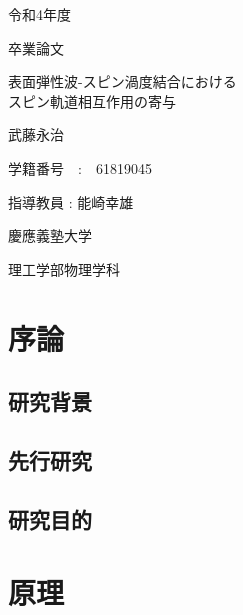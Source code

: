 \documentclass[dvipdfmx]{jsreport}
\numberwithin{equation}{chapter}
\numberwithin{table}{chapter}
\begin{document}
\begin{titlepage}
	\begin{center}
		
		{\large 令和4年度}
		
		\vspace{10truept}
		
		{\large 卒業論文}
		
		\vspace*{100truept}
		
		{\huge 表面弾性波-スピン渦度結合における\\スピン軌道相互作用の寄与} 
		
		\vspace{80truept}
		
		{\LARGE 武藤永治}
		
		\vspace{5truept}
		
		{\Large 学籍番号　:　61819045}
		
		\vspace{70truept}
		
		{\Large 指導教員 : 能崎幸雄}
		
		\vspace{70truept}
		
		{\Large 慶應義塾大学}
		
		\vspace{10truept}
		
		{\Large 理工学部物理学科}
		
    
		
	\end{center}
\end{titlepage}

\setcounter{tocdepth}{3}
\tableofcontents
\clearpage

\chapter{序論}
\section{研究背景}
\section{先行研究}
\section{研究目的}
\chapter{原理}
\end{document}
